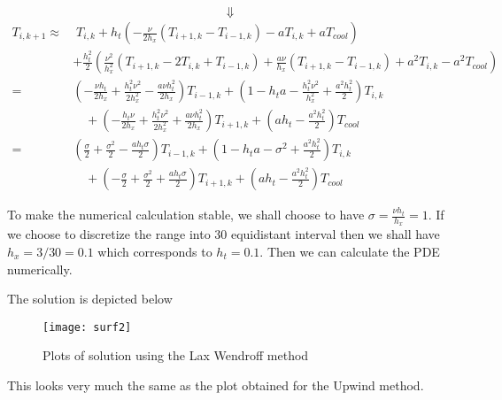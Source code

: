 \documentclass[11pt,a4paper,roman]{scrartcl}
\begin{document}
\begin{equation*}
\Downarrow
\end{equation*}
\begin{equation}
\begin{aligned}
T_{i,k+1} \approx & \;  T_{i,k} + h_t\left( -\frac{\nu}{2 h_x} (T_{i+1,k}-T_{i-1,k}) - a T_{i,k} + a T_{cool} \right) \\
& + \frac{h_t^2}{2} \left(\frac{\nu^2}{h_x^2}\left(T_{i+1,k}-2T_{i,k}+T_{i-1,k}\right) + \frac{a \nu }{h_x} (T_{i+1,k}-T_{i-1,k}) + a^2 T_{i,k} -a^2 T_{cool}\right) \\
= & \left(-\frac{\nu h_t}{2 h_x} + \frac{h_t^2\nu^2}{2 h_x^2} - \frac{a\nu h_t^2}{2 h_x} \right) T_{i-1,k} + \left(1-h_t a - \frac{h_t^2\nu^2}{h_x^2} + \frac{a^2h_t^2}{2} \right) T_{i,k} \\ 
& \quad + \left(-\frac{h_t\nu}{2h_x} + \frac{h_t^2\nu^2}{2 h_x^2}+ \frac{a\nu h_t^2}{2 h_x} \right) T_{i+1, k} + \left(a h_t-\frac{a^2h_t^2}{2}\right)T_{cool}\\
= & \left(\frac{\sigma}{2} + \frac{\sigma^2}{2} - \frac{a h_t \sigma}{2} \right) T_{i-1,k} + \left(1-h_t a - \sigma^2 + \frac{ a^2h_t^2}{2}\right) T_{i,k} \\ 
& \quad + \left(-\frac{\sigma}{2} + \frac{\sigma^2}{2} + \frac{a h_t \sigma}{2} \right) T_{i+1, k} + \left(a h_t-\frac{a^2h_t^2}{2}\right)T_{cool}
\end{aligned}
\end{equation}

To make the numerical calculation stable, we shall choose to have $\sigma  = \frac{\nu h_t}{h_x}= 1$. If we choose to discretize the range into 30 equidistant interval then we shall have $h_x = 3/30 = 0.1$ which corresponds to $h_t = 0.1$. Then we can calculate the PDE numerically.

The solution is depicted below

\begin{figure}[!h]
\centering
\texttt{[image: surf2]}
\caption{Plots of solution using the Lax Wendroff method}
\end{figure}

This looks very much the same as the plot obtained for the Upwind method. 
\end{document}
